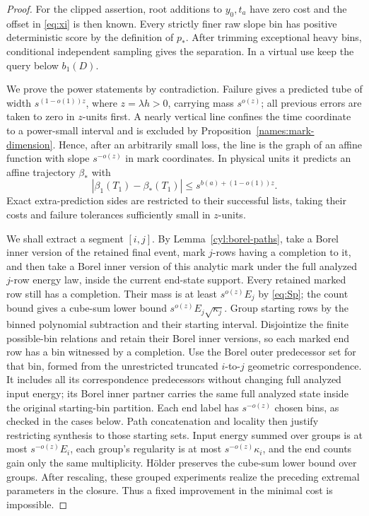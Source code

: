 \begin{proof}
For the clipped assertion, root additions to \(y_0,t_a\) have
zero cost and the offset in \eqref{eq:xi} is then known. Every
strictly finer raw slope bin has positive deterministic score
by the definition of \(p_*\). After trimming exceptional heavy
bins, conditional independent sampling gives the separation.
In a virtual use keep the query below \(b_1(D)\).

We prove the power statements by contradiction. Failure gives
a predicted tube of width \(s^{(1-o(1))z}\), where
\(z=\lambda h>0\), carrying mass \(s^{o(z)}\); all previous
errors are taken to zero in \(z\)-units first. A nearly vertical
line confines the time coordinate to a power-small interval and
is excluded by Proposition~\ref{names:mark-dimension}. Hence,
after an arbitrarily small loss, the line is the graph of an
affine function with slope \(s^{-o(z)}\) in mark coordinates.
In physical units it predicts an affine trajectory \(\beta_*\)
with
\[
 |\beta_1(T_1)-\beta_*(T_1)|
       \leq s^{b(a)+(1-o(1))z}.
\]
Exact extra-prediction sides are restricted to their successful
lists, taking their costs and failure tolerances sufficiently
small in \(z\)-units.

We shall extract a segment \([i,j]\). By
Lemma~\ref{cyl:borel-paths}, take a Borel inner version of the
retained final event, mark \(j\)-rows having a completion to it,
and then take a Borel inner version of this analytic mark under the
full analyzed \(j\)-row energy law, inside the current end-state
support. Every retained marked row still has a
completion. Their mass is at least
\(s^{o(z)}E_j\) by \eqref{eq:Sp}; the count bound gives a
cube-sum lower bound \(s^{o(z)}E_j\sqrt{\kappa_j}\).
Group starting rows by the binned polynomial subtraction and
their starting interval. Disjointize the finite possible-bin
relations and retain their Borel inner versions, so each marked end
row has a bin witnessed by a completion. Use the Borel outer
predecessor set for that bin, formed from the unrestricted truncated
\(i\)-to-\(j\) geometric correspondence. It includes all its
correspondence predecessors without changing full analyzed input energy;
its Borel inner partner carries the same full analyzed state inside
the original starting-bin partition. Each end label has
\(s^{-o(z)}\) chosen bins, as checked in the cases below.
Path concatenation and locality
then justify restricting synthesis to those starting sets.
Input energy summed over groups is at most
\(s^{-o(z)}E_i\), each group's regularity is at most
\(s^{-o(z)}\kappa_i\), and the end counts gain only the same
multiplicity. H\"older preserves the cube-sum lower bound
over groups. After rescaling, these grouped experiments realize
the preceding extremal parameters in the closure. Thus a fixed
improvement in the minimal cost is impossible.


\end{proof}
